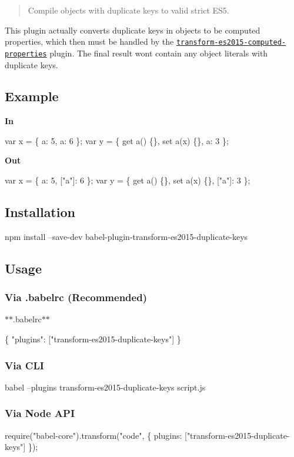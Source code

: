 \begin{quote}
Compile objects with duplicate keys to valid strict E\+S5. \end{quote}


This plugin actually converts duplicate keys in objects to be computed properties, which then must be handled by the \href{http://babeljs.io/docs/plugins/transform-es2015-computed-properties}{\tt transform-\/es2015-\/computed-\/properties} plugin. The final result won\textquotesingle{}t contain any object literals with duplicate keys.

\subsection*{Example}

{\bfseries In}


\begin{DoxyCode}
var x = \{ a: 5, a: 6 \};
var y = \{
  get a() \{\},
  set a(x) \{\},
  a: 3
\};
\end{DoxyCode}


{\bfseries Out}


\begin{DoxyCode}
var x = \{ a: 5, ["a"]: 6 \};
var y = \{
  get a() \{\},
  set a(x) \{\},
  ["a"]: 3
\};
\end{DoxyCode}


\subsection*{Installation}


\begin{DoxyCode}
npm install --save-dev babel-plugin-transform-es2015-duplicate-keys
\end{DoxyCode}


\subsection*{Usage}

\subsubsection*{Via {\ttfamily .babelrc} (Recommended)}

$\ast$$\ast$.babelrc$\ast$$\ast$


\begin{DoxyCode}
\{
  "plugins": ["transform-es2015-duplicate-keys"]
\}
\end{DoxyCode}


\subsubsection*{Via C\+LI}


\begin{DoxyCode}
babel --plugins transform-es2015-duplicate-keys script.js
\end{DoxyCode}


\subsubsection*{Via Node A\+PI}


\begin{DoxyCode}
require("babel-core").transform("code", \{
  plugins: ["transform-es2015-duplicate-keys"]
\});
\end{DoxyCode}
 